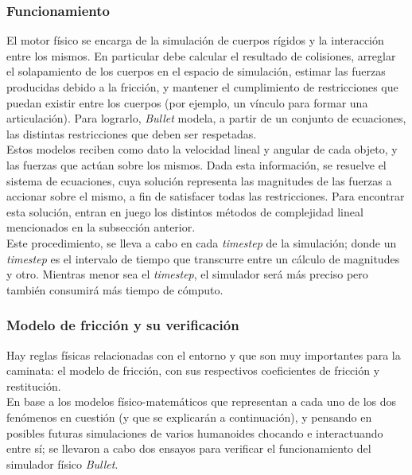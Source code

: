 \documentclass{article}
\begin{document}
\subsubsection{Funcionamiento}
El motor f\'isico se encarga de la simulaci\'on de cuerpos r\'igidos y la interacci\'on entre los mismos.
En particular debe calcular el resultado de colisiones, arreglar el solapamiento
de los cuerpos en el espacio de simulaci\'on, estimar las fuerzas producidas debido a la fricci\'on, 
y mantener el cumplimiento de restricciones que puedan existir entre los cuerpos 
(por ejemplo, un v\'inculo para formar una articulaci\'on). Para lograrlo, \textit{Bullet} modela, 
a partir de un conjunto de ecuaciones, las distintas restricciones que deben ser respetadas. \\ 
Estos modelos reciben como dato la velocidad lineal
y angular de cada objeto, y las fuerzas que act\'uan sobre los mismos. Dada esta
informaci\'on, se resuelve el sistema de ecuaciones, cuya soluci\'on representa
las magnitudes de las fuerzas a accionar sobre el mismo, a fin de satisfacer todas las
restricciones. Para encontrar esta soluci\'on, entran en juego los distintos m\'etodos de
complejidad lineal mencionados en la subsecci\'on anterior. \\
Este procedimiento, se lleva a cabo en cada \textit{timestep} de la simulaci\'on; donde un \textit{timestep}
es el intervalo de tiempo que transcurre entre un c\'alculo de magnitudes y otro. Mientras 
menor sea el \textit{timestep}, el simulador ser\'a m\'as preciso pero tambi\'en consumir\'a m\'as tiempo
de c\'omputo.



\subsubsection{Modelo de fricci\'on y su verificaci\'on}

Hay reglas f\'isicas relacionadas con el entorno y que son muy importantes para la caminata: el modelo de fricci\'on, con sus respectivos coeficientes de fricci\'on y restituci\'on.\\  
En base a los modelos f\'isico-matem\'aticos que representan a cada uno de los dos fen\'omenos en cuesti\'on (y que se explicar\'an a continuaci\'on), y pensando en posibles futuras simulaciones de varios humanoides chocando e interactuando entre s\'i; se llevaron a cabo dos ensayos para verificar el funcionamiento del simulador f\'isico \textit{Bullet}.
\end{document}
